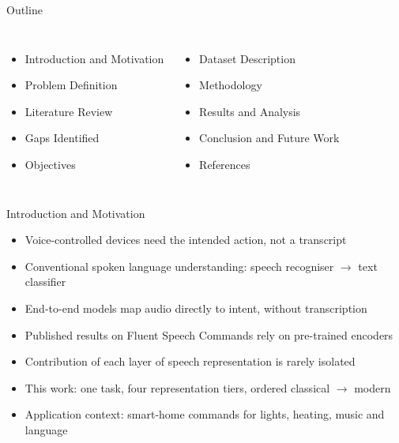 \documentclass[aspectratio=169,10pt,xcolor=table]{beamer}
\begin{document}
\begin{frame}{Outline}
\begin{columns}[T]
\begin{itemize}\setlength{\itemsep}{3pt}
\item Introduction and Motivation
\item Problem Definition
\item Literature Review
\item Gaps Identified
\item Objectives
\end{itemize}
\begin{itemize}\setlength{\itemsep}{3pt}
\item Dataset Description
\item Methodology
\item Results and Analysis
\item Conclusion and Future Work
\item References
\end{itemize}
\end{columns}
\end{frame}

\begin{frame}{Introduction and Motivation}
\begin{itemize}\setlength{\itemsep}{5pt}
\item Voice-controlled devices need the intended action, not a transcript
\item Conventional spoken language understanding: speech recogniser $\rightarrow$ text classifier
\item End-to-end models map audio directly to intent, without transcription
\item Published results on Fluent Speech Commands rely on pre-trained encoders
\item Contribution of each layer of speech representation is rarely isolated
\item This work: one task, four representation tiers, ordered classical $\rightarrow$ modern
\item Application context: smart-home commands for lights, heating, music and language
\end{itemize}
\end{frame}
\end{document}
